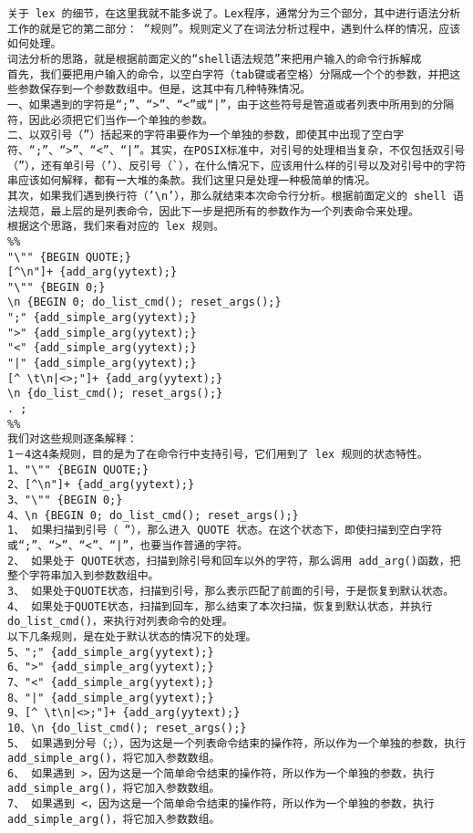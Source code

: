 \begin{lstlisting}
关于 lex 的细节，在这里我就不能多说了。Lex程序，通常分为三个部分，其中进行语法分析工作的就是它的第二部分： “规则”。规则定义了在词法分析过程中，遇到什么样的情况，应该如何处理。 
词法分析的思路，就是根据前面定义的“shell语法规范”来把用户输入的命令行拆解成 
首先，我们要把用户输入的命令，以空白字符（tab键或者空格）分隔成一个个的参数，并把这些参数保存到一个参数数组中。但是，这其中有几种特殊情况。 
一、如果遇到的字符是“;”、“>”、“<”或“|”，由于这些符号是管道或者列表中所用到的分隔符，因此必须把它们当作一个单独的参数。 
二、以双引号（”）括起来的字符串要作为一个单独的参数，即使其中出现了空白字符、“;”、“>”、“<”、“|”。其实，在POSIX标准中，对引号的处理相当复杂，不仅包括双引号（”），还有单引号（’）、反引号（`），在什么情况下，应该用什么样的引号以及对引号中的字符串应该如何解释，都有一大堆的条款。我们这里只是处理一种极简单的情况。 
其次，如果我们遇到换行符（’\n’），那么就结束本次命令行分析。根据前面定义的 shell 语法规范，最上层的是列表命令，因此下一步是把所有的参数作为一个列表命令来处理。 
根据这个思路，我们来看对应的 lex 规则。 
%% 
"\"" {BEGIN QUOTE;} 
[^\n"]+ {add_arg(yytext);} 
"\"" {BEGIN 0;} 
\n {BEGIN 0; do_list_cmd(); reset_args();} 
";" {add_simple_arg(yytext);} 
">" {add_simple_arg(yytext);} 
"<" {add_simple_arg(yytext);} 
"|" {add_simple_arg(yytext);} 
[^ \t\n|<>;"]+ {add_arg(yytext);} 
\n {do_list_cmd(); reset_args();} 
. ; 
%% 
我们对这些规则逐条解释： 
1－4这4条规则，目的是为了在命令行中支持引号，它们用到了 lex 规则的状态特性。 
1、"\"" {BEGIN QUOTE;} 
2、[^\n"]+ {add_arg(yytext);} 
3、"\"" {BEGIN 0;} 
4、\n {BEGIN 0; do_list_cmd(); reset_args();} 
1、 如果扫描到引号（ “），那么进入 QUOTE 状态。在这个状态下，即使扫描到空白字符或“;”、“>”、“<”、“|”，也要当作普通的字符。 
2、 如果处于 QUOTE状态，扫描到除引号和回车以外的字符，那么调用 add_arg()函数，把整个字符串加入到参数数组中。 
3、 如果处于QUOTE状态，扫描到引号，那么表示匹配了前面的引号，于是恢复到默认状态。 
4、 如果处于QUOTE状态，扫描到回车，那么结束了本次扫描，恢复到默认状态，并执行 do_list_cmd()，来执行对列表命令的处理。 
以下几条规则，是在处于默认状态的情况下的处理。 
5、";" {add_simple_arg(yytext);} 
6、">" {add_simple_arg(yytext);} 
7、"<" {add_simple_arg(yytext);} 
8、"|" {add_simple_arg(yytext);} 
9、[^ \t\n|<>;"]+ {add_arg(yytext);} 
10、\n {do_list_cmd(); reset_args();} 
5、 如果遇到分号（;），因为这是一个列表命令结束的操作符，所以作为一个单独的参数，执行 add_simple_arg()，将它加入参数数组。 
6、 如果遇到 >，因为这是一个简单命令结束的操作符，所以作为一个单独的参数，执行 add_simple_arg()，将它加入参数数组。 
7、 如果遇到 <，因为这是一个简单命令结束的操作符，所以作为一个单独的参数，执行 add_simple_arg()，将它加入参数数组。 

\end{lstlisting}
